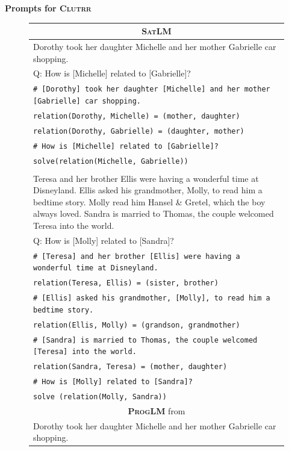 \documentclass{article}
\theoremstyle{definition}
\newcommand{\clutrr}{\textsc{Clutrr}}
\newcommand{\satlm}{\textsc{SatLM}}
\newcommand{\pallm}{\textsc{ProgLM}}
\begin{document}
\textbf{Prompts for \clutrr{}}
\begin{figure}[h]
    \footnotesize
    \centering
    \begin{tabularx}{\linewidth}{X}
    \toprule
            \multicolumn{1}{c}{\textbf{\satlm{}} } \\
         \midrule
Dorothy took her daughter Michelle and her mother Gabrielle car shopping.\\
Q: How is [Michelle] related to [Gabrielle]? \\
  \tt  \# [Dorothy] took her daughter [Michelle] and her mother [Gabrielle] car shopping.\\
  \tt  relation(Dorothy, Michelle) = (mother, daughter)\\
  \tt  relation(Dorothy, Gabrielle) = (daughter, mother)\\
   \tt \# How is [Michelle] related to [Gabrielle]? \\
   \tt solve(relation(Michelle, Gabrielle)) \\
    \\
Teresa and her brother Ellis were having a wonderful time at Disneyland. Ellis asked his grandmother, Molly, to read him a bedtime story. Molly read him Hansel \& Gretel, which the boy always loved. Sandra is married to Thomas, the couple welcomed Teresa into the world. \\
Q: How is [Molly] related to [Sandra]? \\
  \tt  \# [Teresa] and her brother [Ellis] were having a wonderful time at Disneyland. \\
   \tt relation(Teresa, Ellis) = (sister, brother) \\
  \tt  \# [Ellis] asked his grandmother, [Molly], to read him a bedtime story. \\
  \tt  relation(Ellis, Molly) = (grandson, grandmother) \\
  \tt  \# [Sandra] is married to Thomas, the couple welcomed [Teresa] into the world.\\
   \tt relation(Sandra, Teresa) = (mother, daughter) \\
  \tt  \# How is [Molly] related to [Sandra]? \\
  \tt  solve (relation(Molly, Sandra))\\
  \midrule
    \multicolumn{1}{c}{\textbf{\pallm{}} from \cite{faithfulcot}} \\
         \midrule
Dorothy took her daughter Michelle and her mother Gabrielle car shopping. \\

\end{tabularx}
\end{figure}
\end{document}
